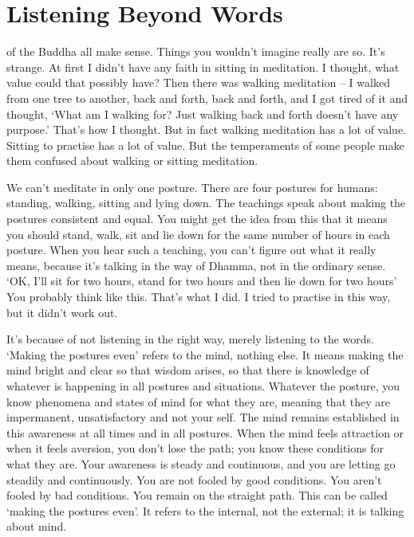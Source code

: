 
\chapter{Listening Beyond Words}

 of the Buddha all make sense. Things you wouldn't imagine really are so. It's strange. At first I didn't have any faith in sitting in meditation. I thought, what value could that possibly have? Then there was walking meditation -- I walked from one tree to another, back and forth, back and forth, and I got tired of it and thought, `What am I walking for? Just walking back and forth doesn't have any purpose.' That's how I thought. But in fact walking meditation has a lot of value. Sitting to practise  has a lot of value. But the temperaments of some people make them confused about walking or sitting meditation. 

We can't meditate in only one posture. There are four postures for humans: standing, walking, sitting and lying down. The teachings speak about making the postures consistent and equal. You might get the idea from this that it means you should stand, walk, sit and lie down for the same number of hours in each posture. When you hear such a teaching, you can't figure out what it really means, because it's talking in the way of Dhamma, not in the ordinary sense. `OK, I'll sit for two hours, stand for two hours and then lie down for two hours' You probably think like this. That's what I did. I tried to practise in this way, but it didn't work out. 

It's because of not listening in the right way, merely listening to the words. `Making the postures even' refers to the mind, nothing else. It means making the mind bright and clear so that wisdom arises, so that there is knowledge of whatever is happening in all postures and situations. Whatever the posture, you know phenomena and states of mind for what they are, meaning that they are impermanent, unsatisfactory and not your self. The mind remains established in this awareness at all times and in all postures. When the mind feels attraction or when it feels aversion, you don't lose the path; you know these conditions for what they are. Your awareness is steady and continuous, and you are letting go steadily and continuously. You are not fooled by good conditions. You aren't fooled by bad conditions. You remain on the straight path. This can be called `making the postures even'. It refers to the internal, not the external; it is talking about mind. 

